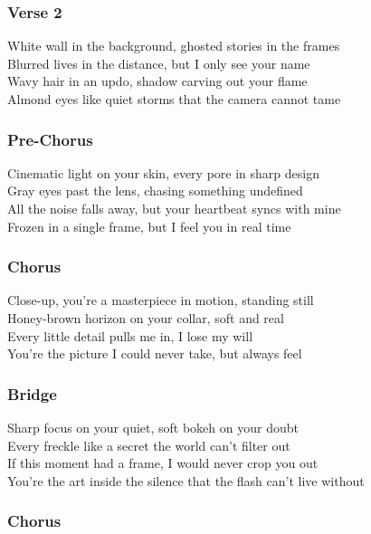 \subsubsection{Verse 2}\label{verse-2-8}

White wall in the background, ghosted stories in the frames\\
Blurred lives in the distance, but I only see your name\\
Wavy hair in an updo, shadow carving out your flame\\
Almond eyes like quiet storms that the camera cannot tame

\subsubsection{Pre-Chorus}\label{pre-chorus-7}

Cinematic light on your skin, every pore in sharp design\\
Gray eyes past the lens, chasing something undefined\\
All the noise falls away, but your heartbeat syncs with mine\\
Frozen in a single frame, but I feel you in real time

\subsubsection{Chorus}\label{chorus-19}

Close-up, you're a masterpiece in motion, standing still\\
Honey-brown horizon on your collar, soft and real\\
Every little detail pulls me in, I lose my will\\
You're the picture I could never take, but always feel

\subsubsection{Bridge}\label{bridge-6}

Sharp focus on your quiet, soft bokeh on your doubt\\
Every freckle like a secret the world can't filter out\\
If this moment had a frame, I would never crop you out\\
You're the art inside the silence that the flash can't live without

\subsubsection{Chorus}\label{chorus-20}

